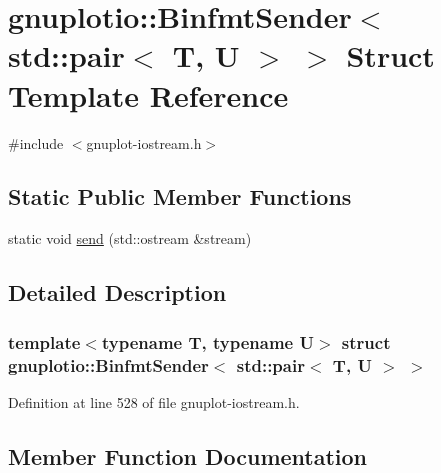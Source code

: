 \hypertarget{structgnuplotio_1_1_binfmt_sender_3_01std_1_1pair_3_01_t_00_01_u_01_4_01_4}{}\section{gnuplotio\+:\+:Binfmt\+Sender$<$ std\+:\+:pair$<$ T, U $>$ $>$ Struct Template Reference}
\label{structgnuplotio_1_1_binfmt_sender_3_01std_1_1pair_3_01_t_00_01_u_01_4_01_4}


{\ttfamily \#include $<$gnuplot-\/iostream.\+h$>$}

\subsection*{Static Public Member Functions}
\begin{DoxyCompactItemize}
\item 
static void \hyperlink{structgnuplotio_1_1_binfmt_sender_3_01std_1_1pair_3_01_t_00_01_u_01_4_01_4_a08b2bedbc54824cd202c664116e37243}{send} (std\+::ostream \&stream)
\end{DoxyCompactItemize}


\subsection{Detailed Description}
\subsubsection*{template$<$typename T, typename U$>$\newline
struct gnuplotio\+::\+Binfmt\+Sender$<$ std\+::pair$<$ T, U $>$ $>$}



Definition at line 528 of file gnuplot-\/iostream.\+h.



\subsection{Member Function Documentation}
\mbox{\label{structgnuplotio_1_1_binfmt_sender_3_01std_1_1pair_3_01_t_00_01_u_01_4_01_4_a08b2bedbc54824cd202c664116e37243}} 

